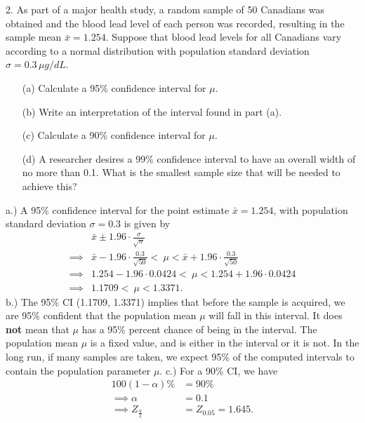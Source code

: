 \documentclass{report}
\begin{document}
\pagebreak \bigbreak \noindent 
\begin{mdframed}
2. As part of a major health study, a random sample of 50 Canadians was obtained and the blood lead level of each person was recorded, resulting in the sample mean $\bar{x} = 1.254$. Suppose that blood lead levels for all Canadians vary according to a normal distribution with population standard deviation $\sigma = 0.3 \, \mu g/dL$.
\begin{itemize}
    \item[(a)] Calculate a 95\% confidence interval for $\mu$.
    \item[(b)] Write an interpretation of the interval found in part (a).
    \item[(c)] Calculate a 90\% confidence interval for $\mu$.
    \item[(d)] A researcher desires a 99\% confidence interval to have an overall width of no more than 0.1. What is the smallest sample size that will be needed to achieve this?
\end{itemize}
\end{mdframed}
\bigbreak \noindent 
a.) A 95\% confidence interval for the point estimate $\bar{x} = 1.254$, with population standard deviation $\sigma = 0.3$ is given by
\begin{align*}
    &\bar{x} \pm 1.96 \cdot \frac{\sigma}{\sqrt{n}} \\
    \implies &\bar{x} - 1.96 \cdot \frac{0.3}{\sqrt{50}} <\ \mu < \bar{x} + 1.96 \cdot  \frac{0.3}{\sqrt{50}} \\
    \implies  &1.254 - 1.96 \cdot  0.0424 <\ \mu < 1.254 + 1.96 \cdot 0.0424 \\
    \implies &1.1709 <\ \mu < 1.3371
.\end{align*}
\bigbreak \noindent 
b.) The 95\% CI (1.1709, 1.3371) implies that before the sample is acquired, we are 95\% confident that the population mean $\mu$ will fall in this interval. It does \textbf{not} mean that $\mu$ has a 95\% percent chance of being in the interval. The population mean $\mu$ is a fixed value, and is either in the interval or it is not. In the long run, if many samples are taken, we expect 95\% of the computed intervals to contain the population parameter $\mu$.
\bigbreak \noindent 
c.) For a 90\% CI, we have
\begin{align*}
    100(1-\alpha)\% &= 90\% \\
    \implies \alpha &= 0.1 \\
    \implies Z_{\frac{\alpha}{2}} &= Z_{0.05} = 1.645
.\end{align*}
\end{document}
